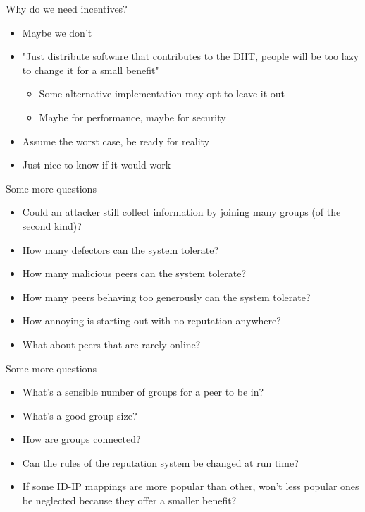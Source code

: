 \documentclass[presentation,english]{beamer}
\begin{document}
\begin{frame}
\end{frame}

\begin{frame}{Why do we need incentives?}
  \begin{itemize}
    \item Maybe we don't
    \item "Just distribute software that contributes to the DHT, people will be
          too lazy to change it for a small benefit"
          \begin{itemize}
            \item Some alternative implementation may opt to leave it out
            \item Maybe for performance, maybe for security
          \end{itemize}
    \item Assume the worst case, be ready for reality
    \item Just nice to know if it would work
  \end{itemize}
\end{frame}

\begin{frame}{Some more questions}
  \begin{itemize}
    \item Could an attacker still collect information by joining many groups (of
          the second kind)?
    \item How many defectors can the system tolerate?
    \item How many malicious peers can the system tolerate?
    \item How many peers behaving too generously can the system tolerate?
    \item How annoying is starting out with no reputation anywhere?
    \item What about peers that are rarely online?
  \end{itemize}
\end{frame}

\begin{frame}{Some more questions}
  \begin{itemize}
    \item What's a sensible number of groups for a peer to be in?
    \item What's a good group size?
    \item How are groups connected?
    \item Can the rules of the reputation system be changed at run time?
    \item If some ID-IP mappings are more popular than other, won't less popular
          ones be neglected because they offer a smaller benefit?
  \end{itemize}
\end{frame}
\end{document}
